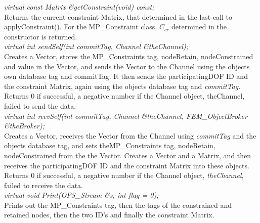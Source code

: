 {\em virtual const Matrix \&getConstraint(void) const;} \\
Returns the current constraint Matrix, that determined in the last
call to applyConstraint(). For the MP\_Constraint class, $C_{cr}$
determined in the constructor is returned. \\

{\em virtual int sendSelf(int commitTag, Channel \&theChannel);} \\
Creates a Vector, stores the MP\_Constraints tag, nodeRetain,
nodeConstrained and value in the Vector, and sends the Vector to the
Channel using the objects own database tag and \p commitTag. It then
sends the \p participatingDOF ID and the \p constraint
Matrix, again using the objects database tag and {\em
commitTag}. Returns $0$ if successful, a negative number if the
Channel object, \p theChannel, failed to send the data. \\ 

{\em virtual int recvSelf(int commitTag, Channel \&theChannel,
FEM\_ObjectBroker \&theBroker);} \\ 
Creates a Vector, receives the Vector from the Channel using {\em
commitTag} and the objects database tag, and sets theMP\_Constraints
tag, nodeRetain, nodeConstrained from the the Vector. Creates a
Vector and a Matrix, and then receives the \p participatingDOF ID
and the \p constraint Matrix into these objects. Returns $0$ if
successful, a negative number if the Channel object, {\em
theChannel}, failed to receive the data.\\ 

{\em virtual void Print(OPS_Stream \&s, int flag = 0);} \\
Prints out the MP\_Constraints tag, then the tags of the constrained
and retained nodes, then the two ID's and finally the constraint Matrix.\\






